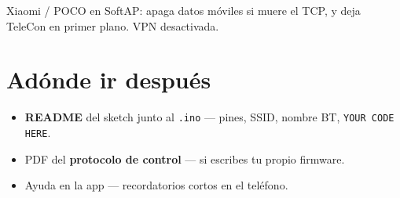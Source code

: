 \documentclass[12pt,a4paper]{article}
\begin{document}
Xiaomi / POCO en SoftAP: apaga datos móviles si muere el TCP, y deja
TeleCon en primer plano. VPN desactivada.

\section{Adónde ir después}
\label{sec:next}

\begin{itemize}[leftmargin=1.4cm]
  \item \textbf{README} del sketch junto al \texttt{.ino} --- pines, SSID,
        nombre BT, \texttt{YOUR CODE HERE}.
  \item PDF del \textbf{protocolo de control} --- si escribes tu propio firmware.
  \item Ayuda en la app --- recordatorios cortos en el teléfono.
\end{itemize}
\end{document}
